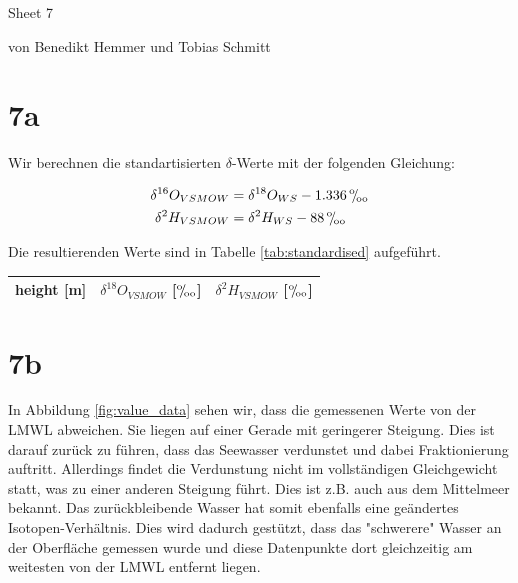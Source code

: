 \documentclass[10pt,a4paper]{article}
\def\permille{\ensuremath{{}^\text{o}\mkern-5mu/\mkern-3mu_\text{oo}}}
\begin{document}
\centerline{\large Sheet 7}\vspace{0.5em}
\centerline{\large von Benedikt Hemmer und Tobias Schmitt}\vspace{2em}

\section*{7a}

Wir berechnen die standartisierten $\delta$-Werte mit der folgenden Gleichung: 

\begin{align*}
\delta^{16} O_{VSMOW} &= \delta^{18} O_{WS} - 1.336 \, \permille \\
\delta^{2} H_{VSMOW} &= \delta^{2} H_{WS} - 88 \, \permille 
\end{align*} 	

Die resultierenden Werte sind in Tabelle \ref{tab:standardised} aufgeführt.

\begin{center}
\begin{tabular}{ccc}
height [m] & $\delta^{18} O_{VSMOW}$ [\permille] & $\delta^{2} H_{VSMOW}$ [\permille] \\ \midrule


\end{tabular}
\label{tab:standardised}
\end{center}

\clearpage

\section*{7b}

In Abbildung \ref{fig:value_data} sehen wir, dass die gemessenen Werte von der LMWL abweichen. Sie liegen auf einer Gerade mit geringerer Steigung.
Dies ist darauf zurück zu führen, dass das Seewasser verdunstet und dabei Fraktionierung auftritt. Allerdings findet die Verdunstung nicht im vollständigen Gleichgewicht statt, was zu einer anderen Steigung führt. Dies ist z.B. auch aus dem Mittelmeer bekannt. Das zurückbleibende Wasser hat somit ebenfalls eine geändertes Isotopen-Verhältnis. Dies wird dadurch gestützt, dass das "schwerere" Wasser an der Oberfläche gemessen wurde und diese Datenpunkte dort gleichzeitig am weitesten von der LMWL entfernt liegen. 
\end{document}
